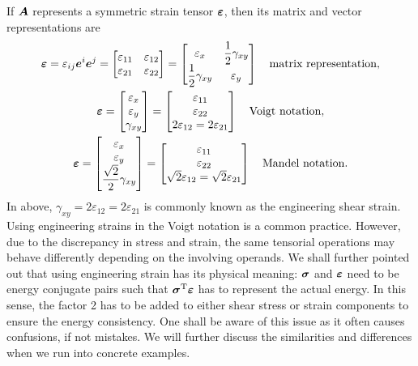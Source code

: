 If $\bm{A}$ represents a symmetric strain tensor $\bm{\varepsilon}$, then its matrix and vector representations are
\begin{gather}
\bm{\varepsilon}=\varepsilon_{ij}\bm{e}^i\bm{e}^j=\begin{bmatrix}
\varepsilon_{11}&\varepsilon_{12}\\
\varepsilon_{21}&\varepsilon_{22}
\end{bmatrix}=\begin{bmatrix}
\varepsilon_x&\dfrac{1}{2}\gamma_{xy}\\
\dfrac{1}{2}\gamma_{xy}&\varepsilon_y
\end{bmatrix}\quad\text{matrix representation},\\
\bm{\varepsilon}=\begin{bmatrix}
\varepsilon_x\\\varepsilon_y\\\gamma_{xy}
\end{bmatrix}=\begin{bmatrix}
\varepsilon_{11}\\\varepsilon_{22}\\2\varepsilon_{12}=2\varepsilon_{21}
\end{bmatrix}\quad\text{Voigt notation},\\
\bm{\varepsilon}=\begin{bmatrix}
\varepsilon_x\\\varepsilon_y\\\dfrac{\sqrt{2}}{2}\gamma_{xy}
\end{bmatrix}=\begin{bmatrix}
\varepsilon_{11}\\\varepsilon_{22}\\\sqrt{2}\varepsilon_{12}=\sqrt{2}\varepsilon_{21}
\end{bmatrix}\quad\text{Mandel notation}.
\end{gather}
In above, $\gamma_{xy}=2\varepsilon_{12}=2\varepsilon_{21}$ is commonly known as the engineering shear strain.
Using engineering strains in the Voigt notation is a common practice.
However, due to the discrepancy in stress and strain, the same tensorial operations may behave differently depending on the involving operands.
We shall further pointed out that using engineering strain has its physical meaning: $\bm{\sigma}$ and $\bm{\varepsilon}$ need to be energy conjugate pairs such that $\bm{\sigma}^{\mathrm{T}}\bm{\varepsilon}$ has to represent the actual energy.
In this sense, the factor \num{2} has to be added to either shear stress or strain components to ensure the energy consistency.
One shall be aware of this issue as it often causes confusions, if not mistakes.
We will further discuss the similarities and differences when we run into concrete examples.

